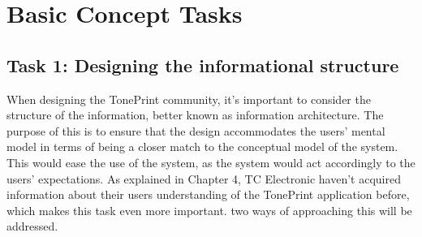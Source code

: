 
\section{Basic Concept Tasks}
\label{BasicConceptTaks}

\subsection{Task 1: Designing the informational structure}
\label{Task1}
When designing the TonePrint community, it's important to consider the structure of the information, better known as information architecture. The purpose of this is to ensure that the design accommodates the users' mental model in terms of being a closer match to the conceptual model of the system. This would ease the use of the system, as the system would act accordingly to the users' expectations. As explained in Chapter 4, TC Electronic haven't acquired information about their users understanding of the TonePrint application before, which makes this task even more important. two ways of approaching this will be addressed. \\

